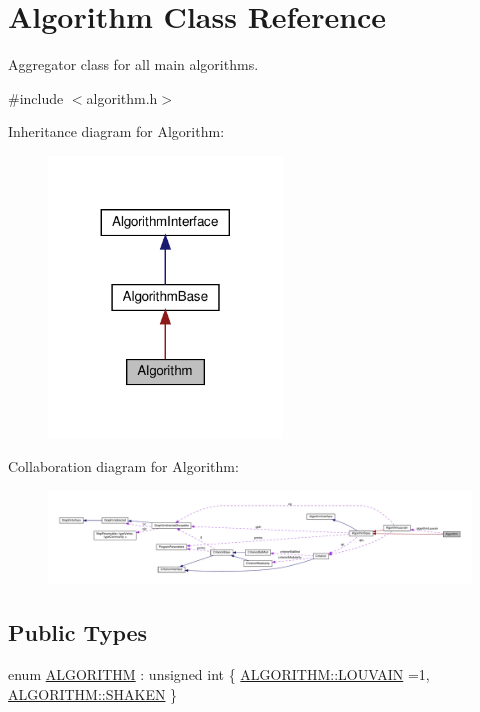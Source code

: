 \hypertarget{classAlgorithm}{}\section{Algorithm Class Reference}
\label{classAlgorithm}


Aggregator class for all main algorithms.  




{\ttfamily \#include $<$algorithm.\+h$>$}



Inheritance diagram for Algorithm\+:
\nopagebreak
\begin{figure}[H]
\begin{center}
\leavevmode
\includegraphics[width=176pt]{classAlgorithm__inherit__graph}
\end{center}
\end{figure}


Collaboration diagram for Algorithm\+:
\nopagebreak
\begin{figure}[H]
\begin{center}
\leavevmode
\includegraphics[width=350pt]{classAlgorithm__coll__graph}
\end{center}
\end{figure}
\subsection*{Public Types}
\begin{DoxyCompactItemize}
\item 
enum \hyperlink{classAlgorithm_a38e19a8c3dc51b97563a34d9e59a748d}{A\+L\+G\+O\+R\+I\+T\+HM} \+: unsigned int \{ \hyperlink{classAlgorithm_a38e19a8c3dc51b97563a34d9e59a748dab77e66715d6be972cdbf6cc4d990e732}{A\+L\+G\+O\+R\+I\+T\+H\+M\+::\+L\+O\+U\+V\+A\+IN} =1, 
\hyperlink{classAlgorithm_a38e19a8c3dc51b97563a34d9e59a748da1081b2130037a7b464f64d6cc82b3100}{A\+L\+G\+O\+R\+I\+T\+H\+M\+::\+S\+H\+A\+K\+EN}
 \}
\end{DoxyCompactItemize}
